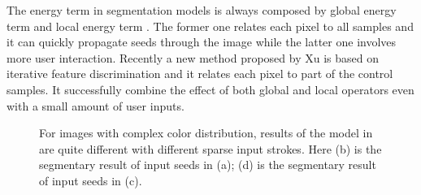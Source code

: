 \documentclass{article}
\begin{document}
The energy term in segmentation models is always composed by global energy term \cite{KassWT88,CasellesKS97} and local energy term \cite{levin2004colorization, lischinski2006interactive}. The former one relates each pixel to all samples and it can quickly propagate seeds through the image while the latter one involves more user interaction. Recently a new method proposed by Xu\cite{xu2013sparse} is based on iterative feature discrimination and it relates each pixel to part of the control samples. It successfully combine the effect of both global and local operators even with a small amount of user inputs.
\begin{figure}[htbp]
\begin{center}
\end{center}
\vspace{-2em}
   \caption{For images with complex color distribution, results of the model in \cite{nguyen2012robust} are quite different with different sparse input strokes. Here (b) is the segmentary result of input seeds in (a); (d) is the segmentary result of input seeds in (c).}
\label{fig:fig1}
\end{figure}
\end{document}
